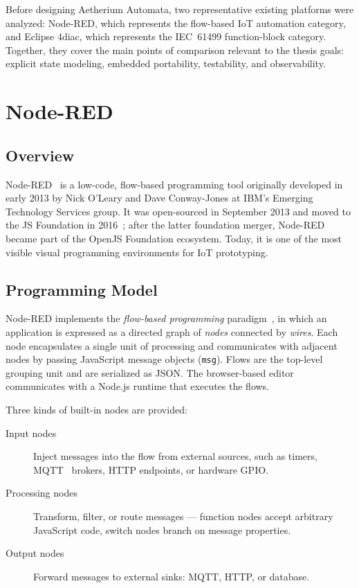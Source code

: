 Before designing Aetherium Automata, two representative existing platforms were analyzed: Node-RED, which represents the flow-based IoT automation category, and Eclipse 4diac, which represents the IEC~61499 function-block category. Together, they cover the main points of comparison relevant to the thesis goals: explicit state modeling, embedded portability, testability, and observability.

\section{Node-RED}
\label{sec:nodered}

\subsection{Overview}

Node-RED~\cite{NodeRED} is a low-code, flow-based programming tool originally developed in early 2013 by Nick O'Leary and Dave Conway-Jones at IBM's Emerging Technology Services group. It was open-sourced in September 2013 and moved to the JS Foundation in 2016~\cite{NodeREDJSFoundation}; after the latter foundation merger, Node-RED became part of the OpenJS Foundation ecosystem. Today, it is one of the most visible visual programming environments for IoT prototyping.

\subsection{Programming Model}

Node-RED implements the \textit{flow-based programming} paradigm~\cite{Morrison1994}, in which an application is expressed as a directed graph of \textit{nodes} connected by \textit{wires}. Each node encapsulates a single unit of processing and communicates with adjacent nodes by passing JavaScript message objects (\texttt{msg}). Flows are the top-level grouping unit and are serialized as JSON. The browser-based editor communicates with a Node.js runtime that executes the flows.

Three kinds of built-in nodes are provided:
\begin{description}
  \item[Input nodes] Inject messages into the flow from external sources, such as timers, MQTT~\cite{MQTT} brokers, HTTP endpoints, or hardware GPIO.
  \item[Processing nodes] Transform, filter, or route messages --- function nodes accept arbitrary JavaScript code, switch nodes branch on message properties.
  \item[Output nodes] Forward messages to external sinks: MQTT, HTTP, or database.
\end{description}

